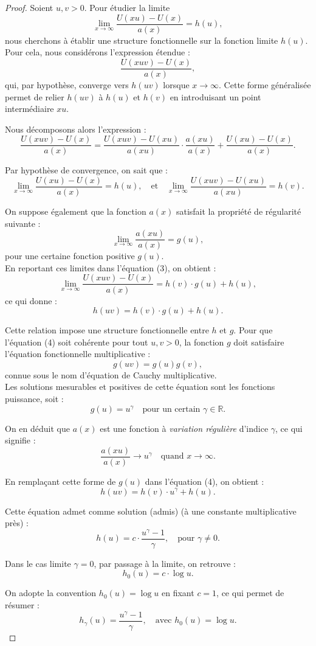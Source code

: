 \documentclass{article}
\theoremstyle{plain}
\theoremstyle{definition}
\theoremstyle{plain}
\begin{document}
\begin{proof} 
Soient $u, v > 0$. Pour étudier la limite
\[
\lim_{x \to \infty} \frac{U(xu) - U(x)}{a(x)} = h(u),
\]
nous cherchons à établir une structure fonctionnelle sur la fonction limite $h(u)$. \\

\noindent Pour cela, nous considérons l’expression étendue :
\[
\frac{U(xuv) - U(x)}{a(x)},
\]
qui, par hypothèse, converge vers $h(uv)$ lorsque $x \to \infty$. Cette forme généralisée permet de relier $h(uv)$ à $h(u)$ et $h(v)$ en introduisant un point intermédiaire $xu$.

\noindent Nous décomposons alors l’expression :
\[
\frac{U(xuv) - U(x)}{a(x)} =
\frac{U(xuv) - U(xu)}{a(xu)} \cdot \frac{a(xu)}{a(x)} +
\frac{U(xu) - U(x)}{a(x)}.
\tag{3}
\]

\noindent Par hypothèse de convergence, on sait que :
\[
\lim_{x \to \infty} \frac{U(xu) - U(x)}{a(x)} = h(u),
\quad \text{et} \quad
\lim_{x \to \infty} \frac{U(xuv) - U(xu)}{a(xu)} = h(v).
\]

\noindent On suppose également que la fonction $a(x)$ satisfait la propriété de régularité suivante :
\[
\lim_{x \to \infty} \frac{a(xu)}{a(x)} = g(u),
\]
pour une certaine fonction positive $g(u)$. \\

\noindent En reportant ces limites dans l'équation (3), on obtient :
\[
\lim_{x \to \infty} \frac{U(xuv) - U(x)}{a(x)} = h(v) \cdot g(u) + h(u),
\]
ce qui donne :
\[
h(uv) = h(v) \cdot g(u) + h(u).
\tag{4}
\]

\noindent Cette relation impose une structure fonctionnelle entre $h$ et $g$. Pour que l'équation (4) soit cohérente pour tout $u, v > 0$, la fonction $g$ doit satisfaire l'équation fonctionnelle multiplicative :
\[
g(uv) = g(u) g(v),
\]
connue sous le nom d’équation de Cauchy multiplicative. \\

\noindent Les solutions mesurables et positives de cette équation sont les fonctions puissance, soit :
\[
g(u) = u^{\gamma} \quad \text{pour un certain } \gamma \in \mathbb{R}.
\]

\noindent On en déduit que $a(x)$ est une fonction à \textit{variation régulière} d’indice $\gamma$, ce qui signifie :
\[
\frac{a(xu)}{a(x)} \longrightarrow u^\gamma \quad \text{quand } x \to \infty.
\]

\noindent En remplaçant cette forme de $g(u)$ dans l’équation (4), on obtient :
\[
h(uv) = h(v) \cdot u^\gamma + h(u).
\]

\noindent Cette équation admet comme solution (admis) (à une constante multiplicative près) :
\[
h(u) = c \cdot \frac{u^\gamma - 1}{\gamma}, \quad \text{pour } \gamma \neq 0.
\]

\noindent Dans le cas limite $\gamma = 0$, par passage à la limite, on retrouve :
\[
h_0(u) = c \cdot \log u.
\]

\noindent On adopte la convention $h_0(u) = \log u$ en fixant $c = 1$, ce qui permet de résumer :
\[
h_\gamma(u) = \frac{u^\gamma - 1}{\gamma}, \quad \text{avec } h_0(u) = \log u.
\]

\end{proof}	
\end{document}

